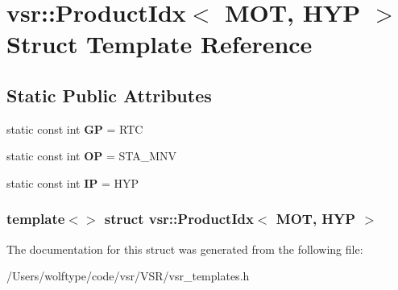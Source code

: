 \hypertarget{structvsr_1_1_product_idx_3_01_m_o_t_00_01_h_y_p_01_4}{\section{vsr\-:\-:Product\-Idx$<$ M\-O\-T, H\-Y\-P $>$ Struct Template Reference}
\label{structvsr_1_1_product_idx_3_01_m_o_t_00_01_h_y_p_01_4}
}
\subsection*{Static Public Attributes}
\begin{DoxyCompactItemize}
\item 
\hypertarget{structvsr_1_1_product_idx_3_01_m_o_t_00_01_h_y_p_01_4_af9230fd6d2727eead153cf9514e3fc2f}{static const int {\bfseries G\-P} = R\-T\-C}\label{structvsr_1_1_product_idx_3_01_m_o_t_00_01_h_y_p_01_4_af9230fd6d2727eead153cf9514e3fc2f}

\item 
\hypertarget{structvsr_1_1_product_idx_3_01_m_o_t_00_01_h_y_p_01_4_af59070470984f7f3a202986da4237c50}{static const int {\bfseries O\-P} = S\-T\-A\-\_\-\-M\-N\-V}\label{structvsr_1_1_product_idx_3_01_m_o_t_00_01_h_y_p_01_4_af59070470984f7f3a202986da4237c50}

\item 
\hypertarget{structvsr_1_1_product_idx_3_01_m_o_t_00_01_h_y_p_01_4_a1682a17eb9ff39f0386003138c4cb075}{static const int {\bfseries I\-P} = H\-Y\-P}\label{structvsr_1_1_product_idx_3_01_m_o_t_00_01_h_y_p_01_4_a1682a17eb9ff39f0386003138c4cb075}

\end{DoxyCompactItemize}
\subsubsection*{template$<$$>$ struct vsr\-::\-Product\-Idx$<$ M\-O\-T, H\-Y\-P $>$}



The documentation for this struct was generated from the following file\-:\begin{DoxyCompactItemize}
\item 
/\-Users/wolftype/code/vsr/\-V\-S\-R/vsr\-\_\-templates.\-h\end{DoxyCompactItemize}
